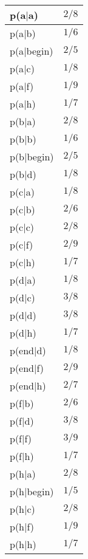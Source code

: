 \begin{tabular}{|l|l|}
\hline
p(a$|$a) & $2/8$ \\
\hline
p(a$|$b) & $1/6$ \\
\hline
p(a$|$begin) & $2/5$ \\
\hline
p(a$|$c) & $1/8$ \\
\hline
p(a$|$f) & $1/9$ \\
\hline
p(a$|$h) & $1/7$ \\
\hline
p(b$|$a) & $2/8$ \\
\hline
p(b$|$b) & $1/6$ \\
\hline
p(b$|$begin) & $2/5$ \\
\hline
p(b$|$d) & $1/8$ \\
\hline
p(c$|$a) & $1/8$ \\
\hline
p(c$|$b) & $2/6$ \\
\hline
p(c$|$c) & $2/8$ \\
\hline
p(c$|$f) & $2/9$ \\
\hline
p(c$|$h) & $1/7$ \\
\hline
p(d$|$a) & $1/8$ \\
\hline
p(d$|$c) & $3/8$ \\
\hline
p(d$|$d) & $3/8$ \\
\hline
p(d$|$h) & $1/7$ \\
\hline
p(end$|$d) & $1/8$ \\
\hline
p(end$|$f) & $2/9$ \\
\hline
p(end$|$h) & $2/7$ \\
\hline
p(f$|$b) & $2/6$ \\
\hline
p(f$|$d) & $3/8$ \\
\hline
p(f$|$f) & $3/9$ \\
\hline
p(f$|$h) & $1/7$ \\
\hline
p(h$|$a) & $2/8$ \\
\hline
p(h$|$begin) & $1/5$ \\
\hline
p(h$|$c) & $2/8$ \\
\hline
p(h$|$f) & $1/9$ \\
\hline
p(h$|$h) & $1/7$ \\
\hline
\end{tabular}